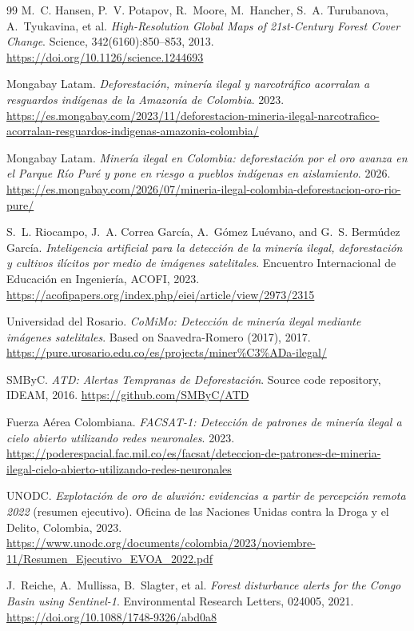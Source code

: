 \documentclass{article}
\begin{document}
\begin{thebibliography}{99}
M.~C. Hansen, P.~V. Potapov, R.~Moore, M.~Hancher, S.~A. Turubanova,
A.~Tyukavina, et al. \textit{High-Resolution Global Maps of 21st-Century Forest
Cover Change}. Science, 342(6160):850--853, 2013.
\url{https://doi.org/10.1126/science.1244693}

Mongabay Latam. \textit{Deforestación, minería ilegal y narcotráfico acorralan
a resguardos indígenas de la Amazonía de Colombia}. 2023.
\url{https://es.mongabay.com/2023/11/deforestacion-mineria-ilegal-narcotrafico-acorralan-resguardos-indigenas-amazonia-colombia/}

Mongabay Latam. \textit{Minería ilegal en Colombia: deforestación por el oro
avanza en el Parque Río Puré y pone en riesgo a pueblos indígenas en aislamiento}.
2026.
\url{https://es.mongabay.com/2026/07/mineria-ilegal-colombia-deforestacion-oro-rio-pure/}

S.~L. Riocampo, J.~A. Correa García, A.~Gómez Luévano, and G.~S. Bermúdez
García. \textit{Inteligencia artificial para la detección de la minería ilegal,
deforestación y cultivos ilícitos por medio de imágenes satelitales}.
Encuentro Internacional de Educación en Ingeniería, ACOFI, 2023.
\url{https://acofipapers.org/index.php/eiei/article/view/2973/2315}

Universidad del Rosario. \textit{CoMiMo: Detección de minería ilegal mediante
imágenes satelitales}. Based on Saavedra-Romero (2017), 2017.
\url{https://pure.urosario.edu.co/es/projects/miner\%C3\%ADa-ilegal/}

SMByC. \textit{ATD: Alertas Tempranas de Deforestación}. Source code repository,
IDEAM, 2016.
\url{https://github.com/SMByC/ATD}

Fuerza Aérea Colombiana. \textit{FACSAT-1: Detección de patrones de minería
ilegal a cielo abierto utilizando redes neuronales}. 2023.
\url{https://poderespacial.fac.mil.co/es/facsat/deteccion-de-patrones-de-mineria-ilegal-cielo-abierto-utilizando-redes-neuronales}

UNODC. \textit{Explotaci\'on de oro de aluvi\'on: evidencias a partir de
percepci\'on remota 2022} (resumen ejecutivo). Oficina de las Naciones Unidas
contra la Droga y el Delito, Colombia, 2023.
\url{https://www.unodc.org/documents/colombia/2023/noviembre-11/Resumen_Ejecutivo_EVOA_2022.pdf}

J.~Reiche, A.~Mullissa, B.~Slagter, et al. \textit{Forest disturbance alerts
for the Congo Basin using Sentinel-1}. Environmental Research Letters,
024005, 2021.
\url{https://doi.org/10.1088/1748-9326/abd0a8}


\end{thebibliography}
\end{document}
